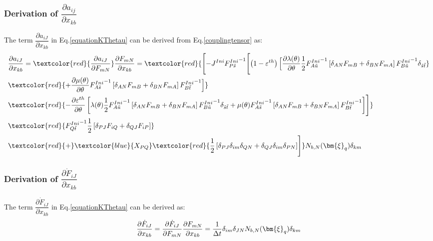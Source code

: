 \documentclass[oneside,11pt,times]{book}
\begin{document}
\subsubsection{Derivation of $\dfrac{\partial{{a_{ij}}}}{\partial{x_{kb}}}$}

The term $\dfrac{\partial{{a_{iJ}}}}{\partial{x_{kb}}}$ in Eq.\eqref{equationKThetau} can be derived from Eq.\eqref{couplingtensor} as:
\begin{equation}
\begin{aligned}
\centering
&\dfrac{\partial{{a_{iJ}}}}{\partial{x_{kb}}}=\textcolor{red}{\dfrac{\partial{{a_{iJ}}}}{\partial{F_{mN}}}}\dfrac{\partial{{F_{mN}}}}{\partial{x_{kb}}}=
\textcolor{red}{\Biggl[
-J^{Ini}{{F}^{Ini}_{P\tilde{s}}}^{-1}\Biggl[\left(1-\varepsilon^{th}\right)\Bigl[\frac{\partial\lambda (\theta)}{\partial \theta} \frac{1}{2}{{F}^{Ini}_{A\tilde{u}}}^{-1}\left[\delta_{AN}F_{mB}+\delta_{BN}F_{mA}\right]{{F}^{Ini}_{B\tilde{u}}}^{-1}\delta_{\tilde{s}\tilde{t}}}\\
&\textcolor{red}{
+\frac{\partial\mu(\theta)}{\partial \theta}{{F}^{Ini}_{A\tilde{s}}}^{-1}\left[\delta_{AN}F_{mB}+\delta_{BN}F_{mA}\right]{{F}^{Ini}_{B\tilde{t}}}^{-1}\Bigr]}\\&\textcolor{red}{-\frac{\partial\varepsilon^{th}}{\partial \theta}\left[\lambda (\theta) \frac{1}{2}{{F}^{Ini}_{A\tilde{u}}}^{-1}\left[\delta_{AN}F_{mB}+\delta_{BN}F_{mA}\right]{{F}^{Ini}_{B\tilde{u}}}^{-1}\delta_{\tilde{s}\tilde{t}} +\mu (\theta){{F}^{Ini}_{A\tilde{s}}}^{-1}\left[\delta_{AN}F_{mB}+\delta_{BN}F_{mA}\right]{{F}^{Ini}_{B\tilde{t}}}^{-1}\right]\Biggr]}\\&\textcolor{red}{{{F}^{Ini}_{Q\tilde{t}}}^{-1}\frac{1}{2}\left[\delta_{PJ}F_{iQ}+\delta_{QJ}F_{iP}\right]}\\&\textcolor{red}{+}\textcolor{blue}{X_{PQ}}\textcolor{red}{\frac{1}{2}\left[\delta_{PJ}\delta_{im}\delta_{QN}+\delta_{QJ}\delta_{im}\delta_{PN}\right]\Biggr]}N_{b,N}(\bm{\xi}_q)\delta_{km}
\end{aligned}
\end{equation}

\subsubsection{Derivation of $\dfrac{\partial{{\dot{F}_{iJ}}}}{\partial{x_{kb}}}$}

The term $\dfrac{\partial{{\dot{F}_{iJ}}}}{\partial{x_{kb}}}$ in Eq.\eqref{equationKThetau} can be derived as:
\begin{equation}
\begin{aligned}
\centering
\dfrac{\partial{{\dot{F}_{iJ}}}}{\partial{x_{kb}}}=\dfrac{\partial{{\dot{F}_{iJ}}}}{\partial{F_{mN}}}\dfrac{\partial{{F_{mN}}}}{\partial{x_{kb}}}=\dfrac{1}{\Delta t}\delta_{im}\delta_{JN}N_{b,N}(\bm{\xi}_q)\delta_{km}
\end{aligned}
\end{equation}
\end{document}
